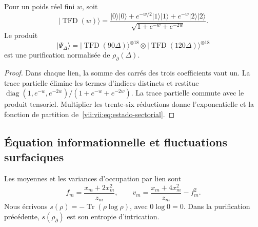 \begin{proposition}
\label{vii:vii:prop:purificacion-sectorial}
Pour un poids réel fini \(w\), soit
\begin{equation}
 |\operatorname{TFD}(w)\rangle
 =\frac{|0\rangle|0\rangle+e^{-w/2}|1\rangle|1\rangle
                   +e^{-w}|2\rangle|2\rangle}
        {\sqrt{1+e^{-w}+e^{-2w}}}.
 \label{vii:vii:eq:tfd-local}
\end{equation}
Le produit
\begin{equation}
 |\Psi_\Delta\rangle
 =|\operatorname{TFD}(90\Delta)\rangle^{\otimes18}
  \otimes|\operatorname{TFD}(120\Delta)\rangle^{\otimes18}
 \label{vii:vii:eq:tfd-sectorial}
\end{equation}
est une purification normalisée de \(\rho_\partial(\Delta)\).
\end{proposition}
\begin{proof}
Dans chaque lien, la somme des carrés des trois coefficients vaut un.
La trace partielle élimine les termes d'indices distincts et restitue
\(\operatorname{diag}(1,e^{-w},e^{-2w})/(1+e^{-w}+e^{-2w})\).
La trace partielle commute avec le produit tensoriel. Multiplier les
trente-six réductions donne l'exponentielle et la fonction de partition
de~\eqref{vii:vii:eq:estado-sectorial}.
\end{proof}

\subsection{Équation informationnelle et fluctuations surfaciques}
\label{vii:vii:subsec:ecuacion-informacional}

Les moyennes et les variances d'occupation par lien sont
\begin{equation}
 f_m=\frac{x_m+2x_m^2}{z_m},\qquad
 v_m=\frac{x_m+4x_m^2}{z_m}-f_m^2.
 \label{vii:vii:eq:momentos-sectoriales}
\end{equation}
Nous écrivons \(s(\rho)=-\operatorname{Tr}(\rho\log\rho)\), avec \(0\log0=0\). Dans la purification précédente, \(s(\rho_\partial)\) est son entropie d'intrication.

